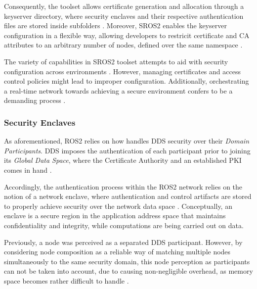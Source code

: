 Consequently, the toolset allows certificate generation and allocation through a keyserver directory, where security enclaves and their respective authentication files are stored inside subfolders \cite{white2016sros, ros-dds-integration}. Moreover, SROS2 enables the keyserver configuration in a flexible way, allowing developers to restricit certificate and CA attributes to an arbitrary number of nodes, defined over the same namespace \cite{white2016sros}.

The variety of capabilities in SROS2 toolset attempts to aid with security configuration across environments \cite{ros-dds-integration}. However, managing certificates and access control policies might lead to improper configuration. Additionally, orchestrating a real-time network towards achieving a secure environment confers to be a demanding process \cite{ros-dds-integration, white2019network}.


\subsubsection{Security Enclaves}

As aforementioned, ROS2 relies on how handles DDS security over their \textit{Domain Participants}. DDS imposes the authentication of each participant prior to joining its \textit{Global Data Space}, where the Certificate Authority and an established PKI comes in hand \cite{white2019network, white2016sros}.

Accordingly, the authentication process within the ROS2 network relies on the notion of a network enclave, where authentication and control artifacts are stored to properly achieve security over the network data space \cite{ros-security-enclaves}. Conceptually, an enclave is a secure region in the application address space that maintains confidentiality and integrity, while computations are being carried out on data.

Previously, a node was perceived as a separated DDS participant. However, by considering node composition as a reliable way of matching multiple nodes simultaneously to the same security domain, this node perception as participants can not be taken into account, due to causing non-negligible overhead, as memory space becomes rather difficult to handle \cite{ros-security-enclaves, ros-access-control}.

